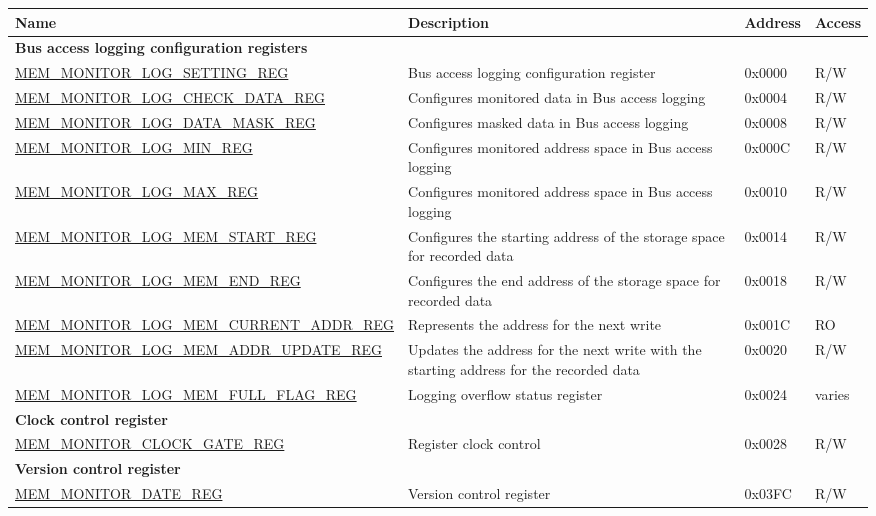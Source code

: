 \begin{longtable}{ | l| m{5cm} | l | l | }
\hline\rowcolor{lightgray}
{\bfseries Name} & {\bfseries Description} &  {\bfseries Address} & {\bfseries Access} \\ \hline
\endhead
\multicolumn{4}{|l|}{\textbf{Bus access logging configuration registers}} \\ \hline
\hyperref[regdesc:MEMMONITORLOGSETTINGREG]{MEM\_MONITOR\_LOG\_SETTING\_REG} & Bus access logging configuration register & 0x0000 & R/W \\ \hline
\hyperref[regdesc:MEMMONITORLOGCHECKDATAREG]{MEM\_MONITOR\_LOG\_CHECK\_DATA\_REG} & Configures monitored data in Bus access logging & 0x0004 & R/W \\ \hline
\hyperref[regdesc:MEMMONITORLOGDATAMASKREG]{MEM\_MONITOR\_LOG\_DATA\_MASK\_REG} & Configures masked data in Bus access logging & 0x0008 & R/W \\ \hline
\hyperref[regdesc:MEMMONITORLOGMINREG]{MEM\_MONITOR\_LOG\_MIN\_REG} & Configures monitored address space in Bus access logging & 0x000C & R/W \\ \hline
\hyperref[regdesc:MEMMONITORLOGMAXREG]{MEM\_MONITOR\_LOG\_MAX\_REG} & Configures monitored address space in Bus access logging & 0x0010 & R/W \\ \hline
\hyperref[regdesc:MEMMONITORLOGMEMSTARTREG]{MEM\_MONITOR\_LOG\_MEM\_START\_REG} & Configures the starting address of the storage space for recorded data & 0x0014 & R/W \\ \hline
\hyperref[regdesc:MEMMONITORLOGMEMENDREG]{MEM\_MONITOR\_LOG\_MEM\_END\_REG} & Configures the end address of the storage space for recorded data & 0x0018 & R/W \\ \hline
\hyperref[regdesc:MEMMONITORLOGMEMCURRENTADDRREG]{MEM\_MONITOR\_LOG\_MEM\_CURRENT\_ADDR\_REG} & Represents the address for the next write & 0x001C & RO \\ \hline
\hyperref[regdesc:MEMMONITORLOGMEMADDRUPDATEREG]{MEM\_MONITOR\_LOG\_MEM\_ADDR\_UPDATE\_REG} & Updates the address for the next write with the starting address for the recorded data & 0x0020 & R/W \\ \hline
\hyperref[regdesc:MEMMONITORLOGMEMFULLFLAGREG]{MEM\_MONITOR\_LOG\_MEM\_FULL\_FLAG\_REG} & Logging overflow status register & 0x0024 & varies \\ \hline
\multicolumn{4}{|l|}{\textbf{Clock control register}} \\ \hline
\hyperref[regdesc:MEMMONITORCLOCKGATEREG]{MEM\_MONITOR\_CLOCK\_GATE\_REG} &  Register clock control & 0x0028 & R/W \\ \hline
\multicolumn{4}{|l|}{\textbf{Version control register}} \\ \hline
\hyperref[regdesc:MEMMONITORDATEREG]{MEM\_MONITOR\_DATE\_REG} & Version control register & 0x03FC & R/W \\ \hline
\end{longtable}
